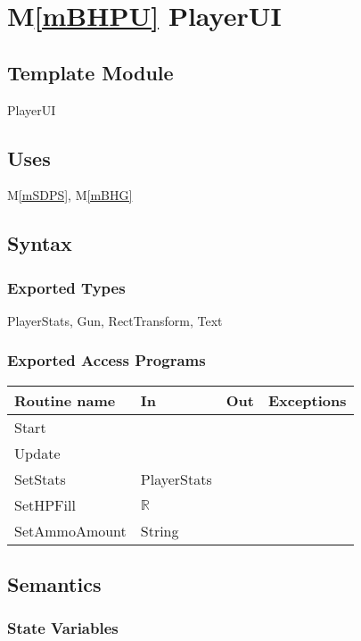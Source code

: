 \documentclass[12pt]{article}
\newcommand{\mref}[1]{M\ref{#1}}
\begin{document}
{\color {magenta} 
\section* {\mref{mBHPU} PlayerUI}

\subsection*{Template Module}

PlayerUI

\subsection* {Uses}

\mref{mSDPS}, \mref{mBHG}

\subsection* {Syntax}

\subsubsection* {Exported Types}

PlayerStats, Gun, RectTransform, Text

\subsubsection* {Exported Access Programs}

\begin{tabular}{| l | l | l | l |}
\hline
\textbf{Routine name} & \textbf{In} & \textbf{Out} & \textbf{Exceptions}\\
\hline
Start & ~ & ~ & ~\\
Update & ~ & ~ & ~\\
SetStats & PlayerStats & ~ & ~\\
SetHPFill & $\mathbb{R}$ & ~ & ~\\
SetAmmoAmount & String & ~ & ~\\
\hline
\end{tabular}

\subsection* {Semantics}

\subsubsection* {State Variables}

}
\end{document}
